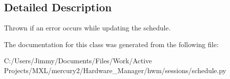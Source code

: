 \subsection{Detailed Description}
Thrown if an error occurs while updating the schedule. 



The documentation for this class was generated from the following file\-:\begin{DoxyCompactItemize}
\item 
C\-:/\-Users/\-Jimmy/\-Documents/\-Files/\-Work/\-Active Projects/\-M\-X\-L/mercury2/\-Hardware\-\_\-\-Manager/hwm/sessions/schedule.\-py\end{DoxyCompactItemize}
